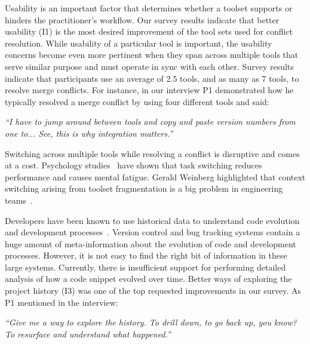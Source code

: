 Usability is an important factor that determines whether a toolset supports or hinders the practitioner's workflow.
Our survey results indicate that better usability (I1) is the most desired improvement of the tool sets used for conflict resolution. 
While usability of a particular tool is important, the usability concerns become even more pertinent when they span across multiple tools that serve similar purpose and must operate in sync with each other.
Survey results indicate that participants use an average of 2.5 tools, and as many as 7 tools, to resolve merge conflicts.
For instance, in our interview P1 demonstrated how he typically resolved a merge conflict by using four different tools and said: 
\begin{displayquote}
\textit{``I have to jump around between tools and copy and paste version numbers from one to... See, this is why integration matters.''}
\end{displayquote}

Switching across multiple tools while resolving a conflict is disruptive and comes at a cost. Psychology studies~\cite{Meiran2000}\cite{gopher2000switching} have shown that task switching reduces performance and causes mental fatigue. 
Gerald Weinberg highlighted that context switching arising from toolset fragmentation is a big problem in engineering teams~\cite{Weinberg1992}. 


Developers have been known to use historical data to understand code evolution and development processes~\cite{Mihai_lenses}.
Version control and bug tracking systems contain a huge amount of meta-information about the evolution of code and development processes.
However, it is not easy to find the right bit of information in these large systems. 
Currently, there is insufficient support for performing detailed analysis of how a code snippet evolved over time. 
Better ways of exploring the project history (I3) was one of the top requested improvements in our survey. 
As P1 mentioned in the interview:
\begin{displayquote}
\textit{``Give me a way to explore the history. To drill down, to go back up, you know? To resurface and understand what happened.''}
\end{displayquote}


